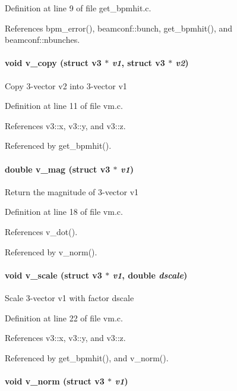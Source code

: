 Definition at line 9 of file get\_\-bpmhit.c.

References bpm\_\-error(), beamconf::bunch, get\_\-bpmhit(), and beamconf::nbunches.
\paragraph[v\_\-copy]{\setlength{\rightskip}{0pt plus 5cm}void v\_\-copy (struct {\bf v3} $\ast$ {\em v1}, \/  struct {\bf v3} $\ast$ {\em v2})}\hfill\label{group__orbit_gdb58fd2d8c710a31eb6ee8391cbf012f}


Copy 3-vector v2 into 3-vector v1 

Definition at line 11 of file vm.c.

References v3::x, v3::y, and v3::z.

Referenced by get\_\-bpmhit().
\paragraph[v\_\-mag]{\setlength{\rightskip}{0pt plus 5cm}double v\_\-mag (struct {\bf v3} $\ast$ {\em v1})}\hfill\label{group__orbit_gb3e57df2a294ae61eca6e6a8a1a7eb71}


Return the magnitude of 3-vector v1 

Definition at line 18 of file vm.c.

References v\_\-dot().

Referenced by v\_\-norm().
\paragraph[v\_\-scale]{\setlength{\rightskip}{0pt plus 5cm}void v\_\-scale (struct {\bf v3} $\ast$ {\em v1}, \/  double {\em dscale})}\hfill\label{group__orbit_g8911c86e1bd11d9f7c827dea0f51b5ee}


Scale 3-vector v1 with factor dscale 

Definition at line 22 of file vm.c.

References v3::x, v3::y, and v3::z.

Referenced by get\_\-bpmhit(), and v\_\-norm().
\paragraph[v\_\-norm]{\setlength{\rightskip}{0pt plus 5cm}void v\_\-norm (struct {\bf v3} $\ast$ {\em v1})}\hfill\label{group__orbit_g7afd07e7d2ea7026d420501405ea689f}


